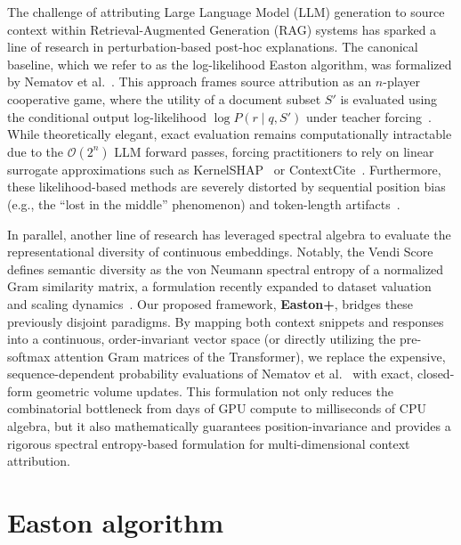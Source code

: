 \documentclass{article}
\begin{document}
The challenge of attributing Large Language Model (LLM) generation to source context within Retrieval-Augmented Generation (RAG) systems has sparked a line of research in perturbation-based post-hoc explanations. 
The canonical baseline, which we refer to as the log-likelihood Easton algorithm, was formalized by Nematov et al.~\cite{nematov2025source}. This approach frames source attribution as an $n$-player cooperative game, where the utility of a document subset $S'$ is evaluated using the conditional output log-likelihood $\log P(r \mid q, S')$ under teacher forcing~\cite{nematov2025source}. 
While theoretically elegant, exact evaluation remains computationally intractable due to the $\mathcal{O}(2^n)$ LLM forward passes, forcing practitioners to rely on linear surrogate approximations such as KernelSHAP~\cite{lundberg2017unified} or ContextCite~\cite{cohen2024contextcite}. 
Furthermore, these likelihood-based methods are severely distorted by sequential position bias (e.g., the ``lost in the middle'' phenomenon) and token-length artifacts~\cite{nematov2025source}.

In parallel, another line of research has leveraged spectral algebra to evaluate the representational diversity of continuous embeddings. 
Notably, the Vendi Score~\cite{friedman2022vendi} defines semantic diversity as the von Neumann spectral entropy of a normalized Gram similarity matrix, a formulation recently expanded to dataset valuation and scaling dynamics~\cite{bilmes2026dataset}. 
Our proposed framework, \textbf{Easton+}, bridges these previously disjoint paradigms. 
By mapping both context snippets and responses into a continuous, order-invariant vector space (or directly utilizing the pre-softmax attention Gram matrices of the Transformer), we replace the expensive, sequence-dependent probability evaluations of Nematov et al.~\cite{nematov2025source} with exact, closed-form geometric volume updates. 
This formulation not only reduces the combinatorial bottleneck from days of GPU compute to milliseconds of CPU algebra, but it also mathematically guarantees position-invariance and provides a rigorous spectral entropy-based formulation for multi-dimensional context attribution.


\section{Easton algorithm}
\end{document}
